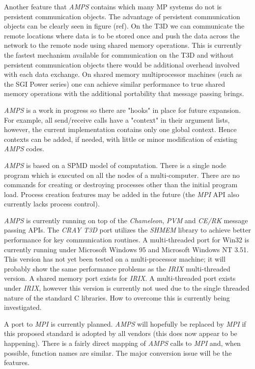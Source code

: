 Another feature that {\em AMPS} contains which many MP systems do not
is persistent communication objects.  The advantage of persistent
communication objects can be clearly seen in figure (ref).  On the T3D
we can communicate the remote locations where data is to be stored
once and push the data across the network to the remote node using
shared memory operations.  This is currently the fastest mechanism
available for communication on the T3D and without persistent
communication objects there would be additional overhead involved with
each data exchange.  On shared memory multiprocessor machines (such as
the SGI Power series) one can achieve similar performance to true
shared memory operations with the additional portability that message
passing brings.

{\em AMPS} is a work in progress so there are "hooks" in place for
future expansion.  For example, all send/receive calls have a "context"
in their argument lists, however, the current implementation contains
only one global context.  Hence contexts can be added, if needed, with
little or minor modification of existing {\em AMPS} codes.

{\em AMPS} is based on a SPMD model of computation.  There is a single
node program which is executed on all the nodes of a multi-computer.
There are no commands for creating or destroying processes other than
the initial program load.  Process creation features may be added in the
future (the {\em MPI} API also currently lacks process control).

{\em AMPS} is currently running on top of the {\em Chameleon}, {\em
PVM} and {\em CE/RK} message passing APIs.  The {\em CRAY T3D} port
utilizes the {\em SHMEM} library to achieve better performance for key
communication routines.  A multi-threaded port for Win32 is currently
running under Microsoft Windows 95 and Microsoft Windows NT 3.51.
This version has not yet been tested on a multi-processor machine; it
will probably show the same performance problems as the {\em IRIX}
multi-threaded version. A shared memory port exists for {\em IRIX}.  A
multi-threaded port exists under {\em IRIX}, however this version is
currently not used due to the single threaded nature of the standard C
libraries.  How to overcome this is currently being investigated.

A port to {\em MPI} is currently planned.  {\em AMPS} will hopefully be
replaced by {\em MPI} if this proposed standard is adopted by all
vendors (this does now appear to be happening).  There is a fairly
direct mapping of {\em AMPS} calls to {\em MPI} and, when possible,
function names are similar.  The major conversion issue will be the
 features.

